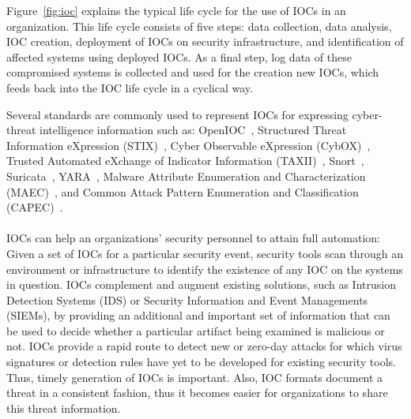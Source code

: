 Figure~\ref{fig:ioc} explains the typical life cycle for the use of IOCs in an organization. This life cycle consists of five steps: data collection, data analysis, IOC creation, deployment of IOCs on security infrastructure, and identification of affected systems using deployed IOCs. As a final step, log data of these compromised systems is collected and used for the creation new IOCs, which feeds back into the IOC life cycle in a cyclical way.


Several standards are commonly used to represent IOCs for expressing cyber-threat intelligence information such as: OpenIOC~\cite{openioc}, Structured Threat Information eXpression (STIX)~\cite{stix}, Cyber Observable eXpression (CybOX)~\cite{cybox}, Trusted Automated eXchange of Indicator Information (TAXII)~\cite{taxii}, Snort~\cite{snort}, Suricata~\cite{suricata}, YARA~\cite{yara}, Malware Attribute Enumeration and Characterization (MAEC)~\cite{maec}, and Common Attack Pattern Enumeration and Classification (CAPEC)~\cite{capec}.

\paragraph{} %
IOCs can help an organizations' security personnel to attain full automation: Given a set of IOCs for a particular security event, security tools scan through an environment or infrastructure to identify the existence of any IOC on the systems in question. IOCs complement and augment existing solutions, such as Intrusion Detection Systems (IDS) or Security Information and Event Managements (SIEMs), by providing an additional and important set of information that can be used to decide whether a particular artifact being examined is malicious or not. IOCs provide a rapid route to detect new or zero-day attacks for which virus signatures or detection rules have yet to be developed for existing security tools. Thus, timely generation of IOCs is important. Also, IOC formats document a threat in a consistent fashion, thus it becomes easier for organizations to share this threat information. 


